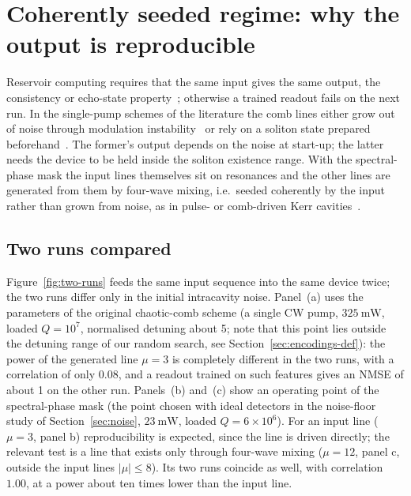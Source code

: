 \section{Coherently seeded regime: why the output is reproducible}\label{sec:mechanism}

Reservoir computing requires that the same input gives the same output, the consistency or echo-state
property~\cite{jaeger2001,uchida2004}; otherwise a trained readout fails on the next run. In the single-pump schemes of the
literature the comb lines either grow out of noise through modulation instability~\cite{shishavan2025} or rely on a soliton state
prepared beforehand~\cite{cuevas2025,arabieh2026soliton}. The former's output depends on the noise at start-up; the latter needs the
device to be held inside the soliton existence range. With the spectral-phase mask the input lines themselves sit on resonances and
the other lines are generated from them by four-wave mixing, i.e.\ seeded coherently by the input rather than grown from noise, as in
pulse- or comb-driven Kerr cavities~\cite{obrzud2017}.

\subsection{Two runs compared}

Figure~\ref{fig:two-runs} feeds the same input sequence into the same device twice; the two runs differ only in the initial
intracavity noise. Panel~(a) uses the parameters of the original chaotic-comb scheme (a single CW pump, $325~\mathrm{mW}$, loaded
$Q=10^{7}$, normalised detuning about 5; note that this point lies outside the detuning range of our random search, see
Section~\ref{sec:encodings-def}): the power of the generated line $\mu=3$ is completely different in the two runs, with a correlation
of only $0.08$, and a readout trained on such features gives an NMSE of about 1 on the other run. Panels~(b) and~(c) show an
operating point of the spectral-phase mask (the point chosen with ideal detectors in the noise-floor study of
Section~\ref{sec:noise}, $23~\mathrm{mW}$, loaded $Q=6\times10^{6}$). For an input line ($\mu=3$, panel b) reproducibility is expected, since the line is
driven directly; the relevant test is a line that exists only through four-wave mixing ($\mu=12$, panel c, outside the input lines
$|\mu|\le8$). Its two runs coincide as well, with correlation $1.00$, at a power about ten times lower than the input line.

